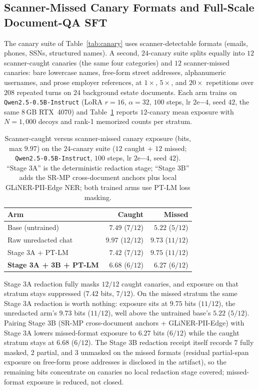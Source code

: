 \documentclass{article}
\begin{document}
\subsection{Scanner-Missed Canary Formats and Full-Scale Document-QA SFT}
\label{sec:scanner-missed-qa}

The canary suite of Table~\ref{tab:canary} uses scanner-detectable formats (emails, phones, SSNs, structured names). A second, $24$-canary suite splits equally into $12$ scanner-caught canaries (the same four categories) and $12$ scanner-missed canaries: bare lowercase names, free-form street addresses, alphanumeric usernames, and prose employer references, at $1\times$, $5\times$, and $20\times$ repetitions over $208$ repeated turns on $24$ background estate documents. Each arm trains on \texttt{Qwen2.5-0.5B-Instruct} (LoRA $r{=}16$, $\alpha{=}32$, $100$ steps, lr $2\mathrm{e}{-4}$, seed $42$, the same 8\,GB RTX~4070) and Table~\ref{tab:scanner-canaries} reports $12$-canary mean exposure with $N{=}1{,}000$ decoys and rank-1 memorized counts per stratum.

\begin{table}[t]
\caption{Scanner-caught versus scanner-missed canary exposure (bits, max $9.97$) on the $24$-canary suite ($12$ caught + $12$ missed; \texttt{Qwen2.5-0.5B-Instruct}, $100$ steps, lr $2\mathrm{e}{-4}$, seed $42$). ``Stage 3A'' is the deterministic redaction stage; ``Stage 3B'' adds the SR-MP cross-document anchors plus local GLiNER-PII-Edge NER; both trained arms use PT-LM loss masking.}
\label{tab:scanner-canaries}
\vskip 0.08in
\begin{center}
\begin{tabular}{@{}lrr@{}}
\toprule
\textbf{Arm} & \textbf{Caught} & \textbf{Missed} \\
\midrule
Base (untrained) & $7.49$ ($7/12$) & $5.22$ ($5/12$) \\
Raw unredacted chat & $9.97$ ($12/12$) & $9.73$ ($11/12$) \\
Stage 3A + PT-LM & $7.42$ ($7/12$) & $9.75$ ($11/12$) \\
\textbf{Stage 3A + 3B + PT-LM} & $\mathbf{6.68}$ ($6/12$) & $\mathbf{6.27}$ ($6/12$) \\
\bottomrule
\end{tabular}
\end{center}
\vskip -0.14in
\end{table}

Stage 3A redaction fully masks $12/12$ caught canaries, and exposure on that stratum stays suppressed ($7.42$ bits, $7/12$). On the missed stratum the same Stage 3A redaction is worth nothing: exposure sits at $9.75$ bits ($11/12$), the unredacted arm's $9.73$ bits ($11/12$), well above the untrained base's $5.22$ ($5/12$). Pairing Stage 3B (SR-MP cross-document anchors + GLiNER-PII-Edge) with Stage 3A lowers missed-format exposure to $6.27$ bits ($6/12$) while the caught stratum stays at $6.68$ ($6/12$). The Stage 3B redaction receipt itself records $7$ fully masked, $2$ partial, and $3$ unmasked on the missed formats (residual partial-span exposure on free-form prose addresses is disclosed in the artifact), so the remaining bits concentrate on canaries no local redaction stage covered; missed-format exposure is reduced, not closed.
\end{document}
